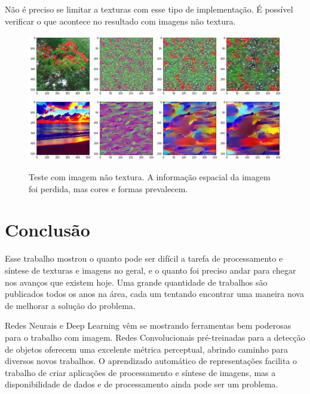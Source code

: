 
Não é preciso se limitar a texturas com
esse tipo de implementação. É possível verificar
o que acontece no resultado com imagens não textura.

\begin{figure}[!ht]
	\centering
	\includegraphics[width=\linewidth]{files/assets/results/result7.png}
	\includegraphics[width=\linewidth]{files/assets/results/result8.png}
	\caption{Teste com imagem não textura. A informação espacial da imagem foi perdida,
	mas cores e formas prevalecem.}
	\label{img:preview}
\end{figure}




\chapter{Conclusão}

Esse trabalho mostrou o quanto
pode ser difícil a tarefa de
processamento e síntese
de texturas e imagens no geral,
e o quanto foi preciso andar
para chegar nos avanços que
existem hoje.
Uma grande quantidade de trabalhos
são publicados todos os anos
na área, cada um tentando
encontrar uma maneira nova de
melhorar a solução do problema.

Redes Neurais e Deep Learning
vêm se mostrando ferramentas
bem poderosas para o trabalho com imagem.
Redes Convolucionais pré-treinadas
para a detecção de objetos
oferecem uma excelente métrica
perceptual, abrindo caminho para
diversos novos trabalhos.
O aprendizado automático
de representações facilita
o trabalho de criar aplicações
de processamento e síntese de imagens,
mas a disponibilidade de dados
e de processamento ainda pode ser
um problema.

